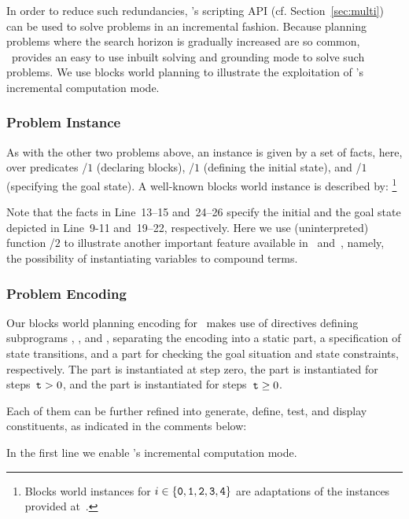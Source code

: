 In order to reduce such redundancies,
\clingo's scripting API (cf. Section~\ref{sec:multi}) can be used to solve problems in an incremental fashion.
Because planning problems where the search horizon is gradually increased are so common,
\clingo\ provides an easy to use inbuilt solving and grounding mode to solve such problems.
We use blocks world planning to illustrate the exploitation of
\clingo's incremental computation mode.

\subsubsection{Problem Instance}\label{subsec:block:instance}

As with the other two problems above,
an instance is given by a set of facts, here,
over predicates /$1$ (declaring blocks),
/$1$ (defining the initial state), and
/$1$ (specifying the goal state).
A well-known blocks world instance is described by:%
\footnote{%
  Blocks world instances  for $i\in\{\texttt{0},\texttt{1},\texttt{2},\texttt{3},\texttt{4}\}$
  are adaptations of the instances provided at~\cite{erdemBW}.}
%

%
Note that the facts in Line~13--15 and~24--26 specify the initial
and the goal state depicted in Line~9-11 and~19--22, respectively.
Here we use (uninterpreted) function /$2$ to illustrate another
important feature available in \gringo\ and~\clingo, namely,
the possibility of instantiating variables to compound terms.


\subsubsection{Problem Encoding}\label{subsec:block:encoding}

Our blocks world planning encoding for \clingo\ makes use of  directives
defining subprograms , , and ,
separating the encoding into 
a static part, 
a specification of state transitions, 
and a part for checking the goal situation and state constraints, respectively.
The  part is instantiated at step zero,
the  part is instantiated for steps~$\texttt{t}>0$,
and the  part is instantiated for steps~$\texttt{t}\geq0$.

Each of them can be further refined into generate, define, test, and display constituents, 
as indicated in the comments below:
%

%
In the first line we enable \clingo's incremental computation mode.

